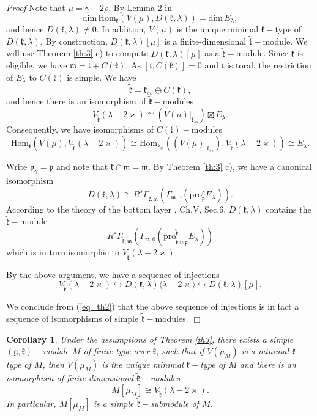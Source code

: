 \documentclass[10pt]{amsart}
\newtheorem{cor}[theo]{Corollary}
\renewenvironment{proof}{ \emph{Proof}}{$\Box$}
\newcommand{\pro}{\mathrm{pro}}
\newcommand{\Hom}{\mathrm{Hom}}
\renewcommand{\gg}{\mathfrak{g}}
\newcommand{\kk}{\mathfrak{k}}
\newcommand{\mm}{\mathfrak{m}}
\newcommand{\pp}{\mathfrak{p}}
\renewcommand{\tt}{\mathfrak{t}}
\begin{document}
\begin{proof}
 Note that $\mu = \gamma -2\rho.$ By Lemma 2 in \cite{PZ3} $$\mathrm{dim}\,\Hom_\kk(V(\mu),D(\kk,\lambda))=\mathrm{dim}\,E_{\lambda},$$ and hence $D(\kk,\lambda) \neq 0$. In addition, $V(\mu)$ is the unique minimal $\kk-$type of $D(\kk,\lambda)$. By construction, $D(\kk,\lambda)[\mu]$ is a finite-dimensional $\tilde{\kk}-$module. We will use Theorem \ref{th:3} c) to compute $D(\kk,\lambda)[\mu]$ as a $\tilde{\kk}-$module. Since $\kk$ is eligible, we have $\mm = \tt+C(\kk)$. As $[\tt,C(\kk)] = 0$ and $\tt$ is toral, the restriction of $E_{\lambda}$ to $C(\kk)$ is simple. We have
$$\tilde{\kk} = \kk_{ss} \oplus C(\kk),$$
and hence there is an isomorphism of $\tilde{\kk}-$modules
$$V_{\tilde{\kk}}(\lambda-2\varkappa) \cong (V(\mu)|_{\kk_{ss}})\boxtimes E_{\lambda}.$$
Consequently, we have isomorphisms of $C(\kk)-$modules
\begin{equation}\label{eq_th2}
 \Hom_{\kk} (V(\mu),V_{\tilde{\kk}}(\lambda - 2\varkappa)) \cong \Hom_{\kk_{ss}} ((V(\mu)|_{\kk_{ss}}),V_{\tilde{\kk}}(\lambda - 2\varkappa)) \cong E_{\lambda}.
\end{equation}
 
Write $\pp_\gamma = \pp$ and note that $\tilde{\kk} \cap \mm = \mm$. By Theorem \ref{th:3} c), we have a canonical isomorphism
$$D(\kk,\lambda) \cong R^s\Gamma_{\tilde{\kk},\mm}(\Gamma_{\mm,0}(\pro^{\gg}_{\pp}E_\lambda)).$$
According to the theory of the bottom layer \cite{KV}, Ch.V, Sec.6, $D(\kk,\lambda)$ contains the $\tilde{\kk}-$module
$$R^s\Gamma_{\tilde{\kk},\mm}(\Gamma_{\mm,0}(\mathrm{pro}_{\tilde{\kk}\cap\pp}^{\tilde{\kk}}E_\lambda))$$
which is in turn isomorphic to $V_{\tilde{\kk}}(\lambda-2\varkappa)$.

By the above argument, we have a sequence of injections
$$V_{\tilde{\kk}}(\lambda-2\varkappa) \hookrightarrow D(\kk,\lambda)\langle\lambda-2\varkappa\rangle \hookrightarrow D(\kk,\lambda)[\mu].$$

We conclude from (\ref{eq_th2}) that the above sequence of injections is in fact a sequence of isomorphisms of simple $\tilde{\kk}-$modules.
\end{proof}

\begin{cor}\label{corr3}
 Under the assumptions of Theorem \ref{th3}, there exists a simple $(\gg,\kk)-$module $M$ of finite type over $\kk$, such that if $V(\mu_M)$ is a minimal $\kk-$type of $M$, then $V(\mu_M)$ is the unique minimal $\kk-$type of $M$ and there is an isomorphism of finite-dimensional $\tilde{\kk}-$modules
$$M[\mu_M] \cong V_{\tilde{\kk}}(\lambda - 2\varkappa).$$ 
In particular, $M[\mu_M]$ is a simple $\tilde{\kk}-$submodule of $M$.
\end{cor}
\end{document}
